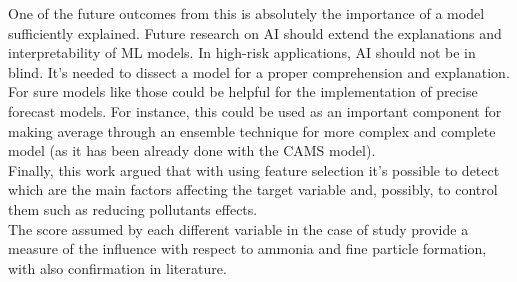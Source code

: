One of the future outcomes from this is absolutely the importance of a model sufficiently explained.
Future research on AI should extend the explanations and interpretability of ML models.
In high-risk applications, AI should not be in blind. 
It's needed to dissect a model for a proper comprehension and explanation.
For sure models like those could be helpful for the implementation of precise forecast models.  
For instance, this could be used as an important component for making average through an ensemble technique for more complex and complete model (as it has been already done with the CAMS model).
\\
Finally, this work argued that with using feature selection it's possible to detect which are the main factors affecting the target variable and, possibly, to control them such as reducing pollutants effects.\\
The score assumed by each different variable in the case of study provide a measure of the influence with respect to ammonia and fine particle formation, with also confirmation in literature.
\begin{comment}
Looking forward, further attempts for reducing pollutant formation should be made by procedures actually used.
\end{comment}
